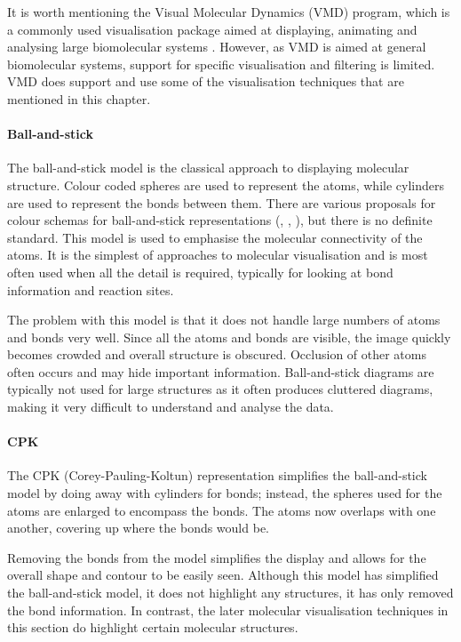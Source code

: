 It is worth mentioning the Visual Molecular Dynamics (VMD) \citep{humphrey96}
program, which is a commonly used visualisation package aimed at displaying,
animating and analysing large biomolecular systems \citep{VMD}. However, as VMD
is aimed at general biomolecular systems, support for specific visualisation
and filtering is limited. VMD does support and use some of the visualisation
techniques that are mentioned in this chapter.


\paragraph{Ball-and-stick}

The ball-and-stick model is the classical approach to displaying molecular
structure. Colour coded spheres are used to represent the atoms, while
cylinders are used to represent the bonds between them. There are various
proposals for colour schemas for ball-and-stick representations
(\citep{rasmolcolour}, \citep{jmolcolour}, \citep{drumscolour}), but there is
no definite standard. This model is used to emphasise the molecular
connectivity of the atoms. It is the simplest of approaches to molecular
visualisation and is most often used when all the detail is required, typically
for looking at bond information and reaction sites.

The problem with this model is that it does not handle large numbers of atoms
and bonds very well. Since all the atoms and bonds are visible, the image
quickly becomes crowded and overall structure is obscured. Occlusion of other
atoms often occurs and may hide important information. Ball-and-stick diagrams
are typically not used for large structures as it often produces cluttered
diagrams, making it very difficult to understand and analyse the data.


\paragraph{CPK}

The CPK (Corey-Pauling-Koltun) \citep{corey53} representation simplifies the
ball-and-stick model by doing away with cylinders for bonds; instead, the
spheres used for the atoms are enlarged to encompass the bonds. The atoms now
overlaps with one another, covering up where the bonds would be.

Removing the bonds from the model simplifies the display and allows for the
overall shape and contour to be easily seen. Although this model has simplified
the ball-and-stick model, it does not highlight any structures, it has only
removed the bond information. In contrast, the later molecular visualisation
techniques in this section do highlight certain molecular structures.

